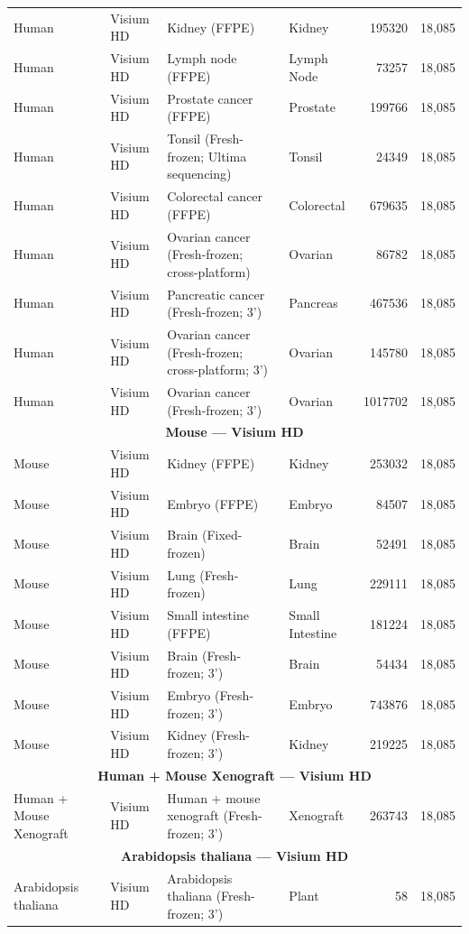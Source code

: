 \documentclass{article}
\begin{document}
\begin{table}[tb]
{\begin{tabular}{l l p{7.2cm} l r r}
Human & Visium HD & Kidney (FFPE) & Kidney & 195320 & 18{,}085 \\
Human & Visium HD & Lymph node (FFPE) & Lymph Node & 73257 & 18{,}085 \\
Human & Visium HD & Prostate cancer (FFPE) & Prostate & 199766 & 18{,}085 \\
Human & Visium HD & Tonsil (Fresh-frozen; Ultima sequencing) & Tonsil & 24349 & 18{,}085 \\
Human & Visium HD & Colorectal cancer (FFPE) & Colorectal & 679635 & 18{,}085 \\
Human & Visium HD & Ovarian cancer (Fresh-frozen; cross-platform) & Ovarian & 86782 & 18{,}085 \\
Human & Visium HD & Pancreatic cancer (Fresh-frozen; 3') & Pancreas & 467536 & 18{,}085 \\
Human & Visium HD & Ovarian cancer (Fresh-frozen; cross-platform; 3') & Ovarian & 145780 & 18{,}085 \\
Human & Visium HD & Ovarian cancer (Fresh-frozen; 3') & Ovarian & 1017702 & 18{,}085 \\
\midrule
\multicolumn{6}{c}{\textbf{Mouse — Visium HD}} \\
\midrule
Mouse & Visium HD & Kidney (FFPE) & Kidney & 253032 & 18{,}085 \\
Mouse & Visium HD & Embryo (FFPE) & Embryo & 84507 & 18{,}085 \\
Mouse & Visium HD & Brain (Fixed-frozen) & Brain & 52491 & 18{,}085 \\
Mouse & Visium HD & Lung (Fresh-frozen) & Lung & 229111 & 18{,}085 \\
Mouse & Visium HD & Small intestine (FFPE) & Small Intestine & 181224 & 18{,}085 \\
Mouse & Visium HD & Brain (Fresh-frozen; 3') & Brain & 54434 & 18{,}085 \\
Mouse & Visium HD & Embryo (Fresh-frozen; 3') & Embryo & 743876 & 18{,}085 \\
Mouse & Visium HD & Kidney (Fresh-frozen; 3') & Kidney & 219225 & 18{,}085 \\
\midrule
\multicolumn{6}{c}{\textbf{Human + Mouse Xenograft — Visium HD}} \\
\midrule
Human + Mouse Xenograft & Visium HD & Human + mouse xenograft (Fresh-frozen; 3') & Xenograft & 263743 & 18{,}085 \\
\midrule
\multicolumn{6}{c}{\textbf{Arabidopsis thaliana — Visium HD}} \\
\midrule
Arabidopsis thaliana & Visium HD & Arabidopsis thaliana (Fresh-frozen; 3') & Plant & 58 & 18{,}085 \\

\end{tabular}}
\end{table}
\end{document}
